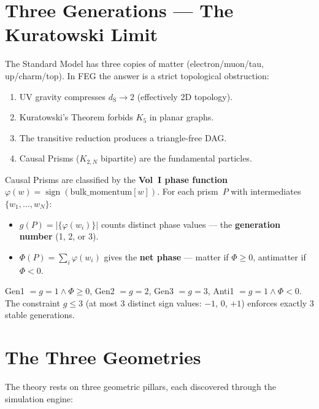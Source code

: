 \documentclass[11pt, a4paper, openany]{book}
\newcommand{\dS}{d_{\mathrm{S}}}
\begin{document}
\section{Three Generations --- The Kuratowski Limit}

The Standard Model has three copies of matter (electron/muon/tau,
up/charm/top).  In FEG the answer is a strict topological obstruction:
\begin{enumerate}
  \item UV gravity compresses $\dS \to 2$ (effectively 2D topology).
  \item Kuratowski's Theorem forbids $K_5$ in planar graphs.
  \item The transitive reduction produces a triangle-free DAG.
  \item Causal Prisms ($K_{2,N}$ bipartite) are the fundamental particles.
\end{enumerate}

Causal Prisms are classified by the \textbf{Vol~I phase function}
$\varphi(w) = \operatorname{sign}(\text{bulk\_momentum}[w])$.  For each prism~$P$
with intermediates $\{w_1, \dots, w_N\}$:
\begin{itemize}
  \item $g(P) = |\{\varphi(w_i)\}|$ counts distinct phase values --- the
        \textbf{generation number} (1, 2, or 3).
  \item $\Phi(P) = \sum_i \varphi(w_i)$ gives the \textbf{net phase} ---
        matter if $\Phi \ge 0$, antimatter if $\Phi < 0$.
\end{itemize}
Gen1 $= g{=}1 \wedge \Phi{\ge}0$, Gen2 $= g{=}2$, Gen3 $= g{=}3$,
Anti1 $= g{=}1 \wedge \Phi{<}0$.  The constraint $g \le 3$ (at most 3
distinct sign values: $-1$, $0$, $+1$) enforces exactly 3 stable generations.

\section{The Three Geometries}

The theory rests on three geometric pillars, each discovered through the
simulation engine:
\end{document}
